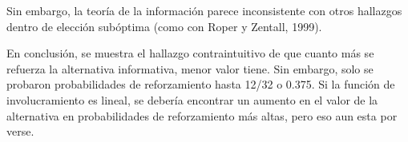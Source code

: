 \documentclass[a4paper,12pt]{article}
\begin{document}
Sin embargo, la teoría de la información parece inconsistente con otros hallazgos dentro de elección subóptima (como con Roper y Zentall, 1999). 

En conclusión, se muestra el hallazgo contraintuitivo de que cuanto más se refuerza la alternativa informativa, menor valor tiene. Sin embargo, solo se probaron probabilidades de reforzamiento hasta 12/32 o 0.375. Si la función de involucramiento es lineal, se debería encontrar un aumento en el valor de la alternativa en probabilidades de reforzamiento más altas, pero eso aun esta por verse.
\end{document}

